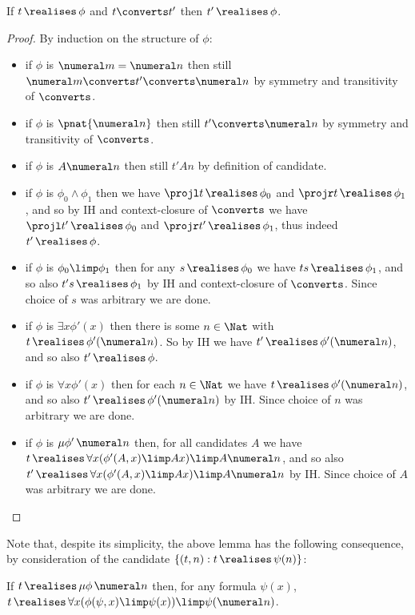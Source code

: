 \begin{lemma}
    \label{lem:realises-closed-under-converts}
    If $t \, \realises\, \phi$ and $t\converts t'$ then $t'\, \realises \, \phi$.
\end{lemma}
\begin{proof}
    By induction on the structure of $\phi$:
    \begin{itemize}
        \item if $\phi$ is $\numeral m=\numeral n$ then still $\numeral m \converts t' \converts \numeral n$ by symmetry and transitivity of $\converts$.
        \item if $\phi$ is $\pnat {\numeral n}$ then still $t' \converts \numeral n$ by symmetry and transitivity of $\converts$.
        \item if $\phi$ is $A\numeral n $ then still $t' A n$ by definition of candidate.
         \item if $\phi$ is $\phi_0 \land \phi_1$ then we have $\projl t \, \realises\, \phi_0$ and $\projr t\, \realises\, \phi_1$, and so by IH and context-closure of $\converts$ we have $\projl t' \, \realises\, \phi_0$ and $\projr t'\, \realises\, \phi_1$, thus indeed $t'\, \realises\, \phi$.
        \item if $\phi$ is $\phi_0 \limp \phi_1$ then for any $s\, \realises\, \phi_0$ we have $ts \, \realises \, \phi_1$, and so also $t's \, \realises \, \phi_1$ by IH and context-closure of $\converts$. 
        Since choice of $s$ was arbitrary we are done.
        \item if $\phi $ is $\exists x\phi'(x)$ then there is some $n\in \Nat $ with $ t \, \realises\, \phi'(\numeral n)$. 
        So by IH we have $ t' \, \realises\, \phi'(\numeral n)$, and so also $t'\, \realises\, \phi $.
        \item if $\phi$ is $\forall x \phi'(x)$ then for each $n\in \Nat$ we have $t\, \realises\, \phi'(\numeral n)$, and so also $t' \, \realises\, \phi'(\numeral n)$ by IH. Since choice of $n$ was arbitrary we are done.
        \item if $\phi$ is $\mu\phi'\, \numeral n$ then, for all candidates $A$ we have $t \, \realises \, \forall x (\phi'(A,x) \limp Ax) \limp A\numeral n$, and so also $t' \, \realises \, \forall x (\phi'(A,x) \limp Ax) \limp A\numeral n$ by IH.
        Since choice of $A$ was arbitrary we are done. \qedhere
    \end{itemize}
\end{proof}

Note that, despite its simplicity, the above lemma has the following consequence, by consideration of the candidate $\{(t,n) : t \, \realises\, \psi(n)\}$:
\begin{lemma}
\label{prop:mu-realiser-realises-formula-invariants}
    If $t \, \realises\, \mu \phi\, \numeral n$ then, for any formula $\psi(x)$, $t \, \realises\, \forall x (\phi(\psi,x) \limp \psi(x)) \limp \psi(\numeral n)$.
\end{lemma}

